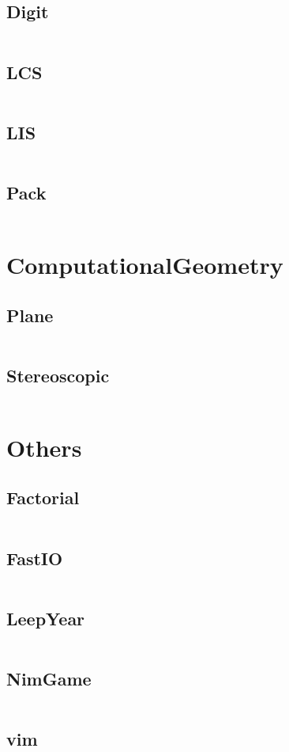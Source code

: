 \documentclass[a4paper,11pt]{article}
\begin{document}
\subsection{Digit}
\inputminted[breaklines]{c++}{M/我的模板/05++DynamicProgramming/+Digit.cpp}
\subsection{LCS}
\inputminted[breaklines]{c++}{M/我的模板/05++DynamicProgramming/+LCS.cpp}
\subsection{LIS}
\inputminted[breaklines]{c++}{M/我的模板/05++DynamicProgramming/+LIS.cpp}
\subsection{Pack}
\inputminted[breaklines]{c++}{M/我的模板/05++DynamicProgramming/+Pack.cpp}

\newpage
\section{ComputationalGeometry}
\subsection{Plane}
\inputminted[breaklines]{c++}{M/我的模板/06++ComputationalGeometry/+Plane.cpp}
\subsection{Stereoscopic}
\inputminted[breaklines]{c++}{M/我的模板/06++ComputationalGeometry/+Stereoscopic.cpp}

\newpage
\section{Others}
\subsection{Factorial}
\inputminted[breaklines]{c++}{M/我的模板/07++Others/+Factorial.cpp}
\subsection{FastIO}
\inputminted[breaklines]{c++}{M/我的模板/07++Others/+FastIO.cpp}
\subsection{LeepYear}
\inputminted[breaklines]{c++}{M/我的模板/07++Others/+LeepYear.cpp}
\subsection{NimGame}
\inputminted[breaklines]{c++}{M/我的模板/07++Others/+NimGame.cpp}
\subsection{vim}
\inputminted[breaklines]{c++}{M/我的模板/07++Others/+vim.vim}

\newpage
\end{document}
